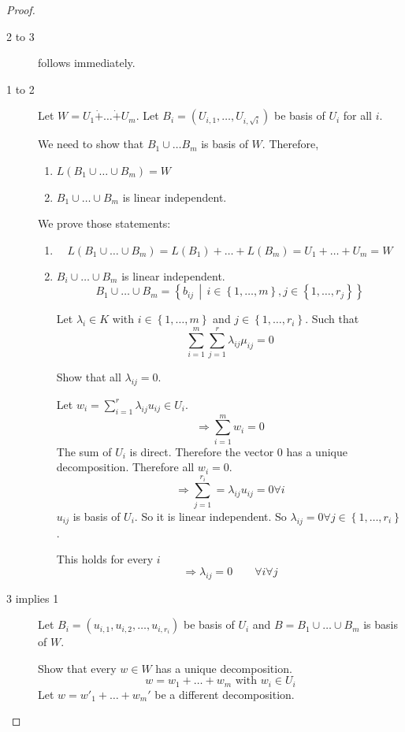 \documentclass[a4paper,landscape,twocolumn]{article}
\newcommand\set[1]{\left\{#1\right\}}
\newcommand\setdef[2]{\left\{#1\,\middle|\,#2\right\}}
\begin{document}
\begin{proof}
  \begin{description}
    \item[2 to 3] follows immediately.
    \item[1 to 2]
      Let $W = U_1 \dot{+} \dots \dot{+} U_m$.
      Let $B_i = (U_{i,1}, \dots, U_{i,\sqrt{i}})$ be basis of $U_i$ for all $i$.

      We need to show that $B_1 \cup \dots B_m$ is basis of $W$. Therefore,
      \begin{enumerate}
        \item $L(B_1 \cup \dots \cup B_m) = W$
        \item $B_1 \cup \dots \cup B_m$ is linear independent.
      \end{enumerate}
      We prove those statements:
      \begin{enumerate}
        \item \[ L(B_1 \cup \dots \cup B_m) = L(B_1) + \dots + L(B_m) = U_1 + \dots + U_m = W \]
        \item $B_i \cup \dots \cup B_m$ is linear independent.
          \[ B_1 \cup \dots \cup B_m = \setdef{b_{ij}}{i \in \set{1, \dots, m}, j \in \set{1, \dots, r_j}} \]

          Let $\lambda_i \in K$ with $i \in \set{1, \dots, m}$ and $j \in \set{1, \dots, r_i}$.
          Such that
          \[ \sum_{i=1}^m \sum_{j=1}^r \lambda_{ij} \mu_{ij} = 0 \]

          Show that all $\lambda_{ij} = 0$.

          Let $w_i = \sum_{i=1}^r \lambda_{ij} u_{ij} \in U_i$.
          \[ \Rightarrow \sum_{i=1}^m w_i = 0 \]
          The sum of $U_i$ is direct.
          Therefore the vector $0$ has a unique decomposition.
          Therefore all $w_i = 0$.
          \[ \Rightarrow \sum_{j=1}^{r_i} = \lambda_{ij} u_{ij} = 0 \forall i \]
          $u_{ij}$ is basis of $U_i$.  So it is linear independent.
          So $\lambda_{ij} = 0 \forall j \in \set{1, \dots, r_i}$.

          This holds for every $i$
          \[ \Rightarrow \lambda_{ij} = 0 \qquad \forall i \forall j \]
      \end{enumerate}
    \item[3 implies 1]
      Let $B_i = (u_{i,1}, u_{i,2}, \dots, u_{i,r_i})$ be basis of $U_i$
      and $B = B_1 \cup \dots \cup B_m$ is basis of $W$.

      Show that every $w \in W$ has a unique decomposition.
      \[ w = w_1 + \dots + w_m \text{ with } w_i \in U_i \]
      Let $w = w'_1 + \dots + w_m'$ be a different decomposition.


\end{description}
\end{proof}
\end{document}

